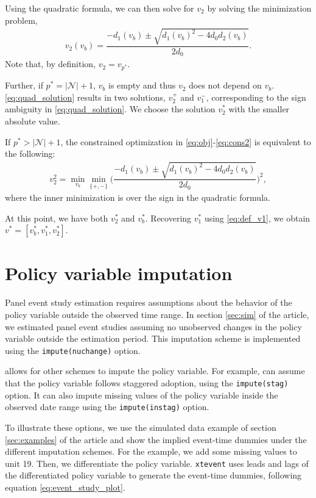 \documentclass[12pt]{article}
\begin{document}
Using the quadratic formula, we can then solve for $v_2$ by solving the minimization problem,
\begin{align}
\label{eq:quad_solution}
v_2(v_b) = \dfrac{-d_1(v_b) \pm \sqrt{d_1(v_b)^2 - 4 d_0 d_2(v_b)}}{2 d_0}.
\end{align}
Note that, by definition, $v_2 = v_{p^*}$.

Further, if $p^*= |\mathcal{N}|+1$, $v_b$ is empty and thus $v_2$ does not depend on $v_b$.
\eqref{eq:quad_solution} results in two solutions, $v_2^+$ and $v_1^-$, corresponding to the sign ambiguity in \eqref{eq:quad_solution}.
We choose the solution $v^*_2$ with the smaller absolute value.

If $p^*> |\mathcal{N}|+1$, the constrained optimization in \eqref{eq:obj}-\eqref{eq:cons2} is equivalent to the following:
\begin{align}
v^2_2 =  \min_{v_b} \min_{\{+,-\}} \bigg( \dfrac{-d_1(v_b) \pm \sqrt{d_1(v_b)^2 - 4 d_0 d_2(v_b)}}{2 d_0} \bigg)^2,\label{eq:quad_solution_min}
\end{align}
where the inner minimization is over the sign in the quadratic formula.

At this point, we have both $v^*_2$ and $v^*_b$.
Recovering $v^*_1$ using \eqref{eq:def_v1}, we obtain $v^*=[v^*_b, v^*_1,  v^*_2]$.

\section{Policy variable imputation}
\label{sec:impute}

Panel event study estimation requires assumptions about the behavior of the policy variable outside the observed time range.
In section \ref{sec:sim} of the article, we estimated panel event studies assuming no unobserved changes in the policy variable outside the estimation period.
This imputation scheme is implemented using the \texttt{impute(nuchange)} option.

\xtevent allows for other schemes to impute the policy variable.
For example, \xtevent can assume that the policy variable follows staggered adoption, using the \texttt{impute(stag)} option.
It can also impute missing values of the policy variable inside the observed date range using the \texttt{impute(instag)} option.

To illustrate these options, we use the simulated data example of section \ref{sec:examples} of the article and show the implied event-time dummies under the different imputation schemes.
For the example, we add some missing values to unit 19.
Then, we differentiate the policy variable.
\texttt{xtevent} uses leads and lags of the differentiated policy variable to generate the event-time dummies, following equation \eqref{eq:event_study_plot}.
\end{document}
